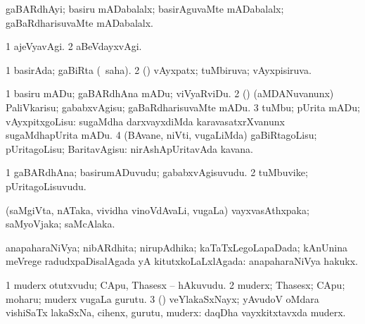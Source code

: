 \bentry
{}
\gl{\gu}
\bmng
gaBARdhAyi; basiru mADabalalx; basirAguvaMte mADabalalx; gaBaRdharisuvaMte mADabalalx. 
\emng
\eentry

\bentry
{}
\gl{\kirxvi}
\bmng
\bnum
\num{1} ajeVyavAgi. 
\num{2} aBeVdayxvAgi. 
\enum
\emng
\eentry

\bentry
{}
\gl{\gu}
\bmng
\bnum
\num{1} basirAda; gaBiRta (\rUpa\ saha). 
\num{2} (\rUpa) vAyxpatx; tuMbiruva; vAyxpisiruva. 
\enum
\emng
\eentry

\bentry
{}
\gl{\sakirx}
\bmng
\bnum
\num{1} basiru mADu; gaBARdhAna mADu; viVyaRviDu. 
\num{2} (\jiVvi) (aMDANuvanunx) PaliVkarisu; gababxvAgisu; gaBaRdharisuvaMte mADu. 
\num{3} tuMbu; pUrita mADu; vAyxpitxgoLisu:  sugaMdha darxvayxdiMda karavasatxrXvanunx sugaMdhapUrita mADu. 
\num{4} (BAvane, niVti, \mo vugaLiMda) gaBiRtagoLisu; pUritagoLisu; BaritavAgisu:  nirAshApUritavAda kavana. 
\enum
\emng
\eentry

\bentry
{}
\gl{\nA}
\bmng
\bnum
\num{1} gaBARdhAna; basirumADuvudu; gababxvAgisuvudu. 
\num{2} tuMbuvike; pUritagoLisuvudu. 
\enum
\emng
\eentry

\bentry
{}
\gl{\nA}
\bmng
(saMgiVta, nATaka, vividha vinoVdAvaLi, \mo vugaLa) vayxvasAthxpaka; saMyoVjaka; saMcAlaka. 
\emng
\eentry

\bentry
{}
\gl{\gu}
\bmng
anapaharaNiVya; nibARdhita; nirupAdhika; kaTaTxLegoLapaDada; kAnUnina meVrege radudxpaDisalAgada yA kitutxkoLaLxlAgada:  anapaharaNiVya hakukx. 
\emng
\eentry

\bentry
{}
\gl{\nA}
\bmng
\bnum
\num{1} muderx otutxvudu; CApu, Thasesx -- hAkuvudu. 
\num{2} muderx; Thasesx; CApu; moharu; muderx \mo vugaLa gurutu. 
\num{3} (\rUpa) veYlakaSxNayx; yAvudoV oMdara vishiSaTx lakaSxNa, cihenx, gurutu, muderx:  daqDha vayxkitxtavxda muderx. 
\enum
\emng
\eentry

